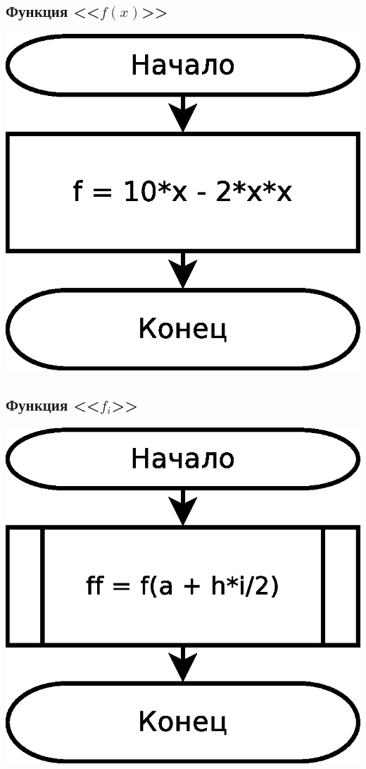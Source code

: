 \documentclass[a4paper]{article}
\begin{document}
\subsection{Функция <<$f(x)$>>}
\includegraphics[scale=0.35]{schemes/f}

\subsection{Функция <<$f_i$>>}
\includegraphics[scale=0.35]{schemes/ff}
\end{document}
